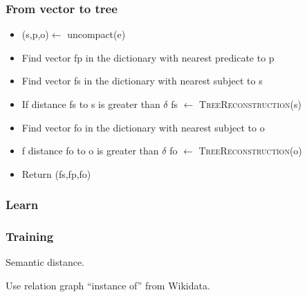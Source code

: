 \begin{frame}
\frametitle{From vector to tree}
\begin{itemize}
\item (s,p,o)$\leftarrow$ uncompact(e)
\item Find vector fp in the dictionary with nearest predicate to p
\item Find vector fs in the dictionary with nearest subject to s
\item If distance fs to s is greater than $\delta$ fs $\leftarrow$ \textsc{TreeReconstruction}(s)
\item Find vector fo in the dictionary with nearest subject to o
\item f distance fo to o is greater than $\delta$ fo $\leftarrow$ \textsc{TreeReconstruction}(o)
\item Return (fs,fp,fo)
\end{itemize}

\end{frame}

\subsubsection{Learn}

\begin{frame}
\frametitle{Training}
Semantic distance.

Use relation graph ``instance of'' from Wikidata.
\end{frame} 
